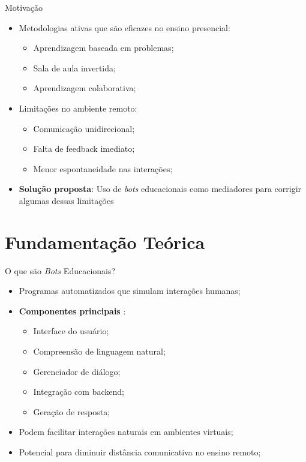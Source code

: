 \documentclass[aspectratio=169]{beamer}
\begin{document}
{\begin{frame}{Motivação}
  \begin{itemize}
  \item Metodologias ativas que são eficazes no ensino presencial:
    \begin{itemize}
    \item Aprendizagem baseada em problemas;
    \item Sala de aula invertida;
    \item Aprendizagem colaborativa;
    \end{itemize}
  \item Limitações no ambiente remoto:
    \begin{itemize}
    \item Comunicação unidirecional;
    \item Falta de feedback imediato;
    \item Menor espontaneidade nas interações;
    \end{itemize}
  \item \textbf{Solução proposta}: Uso de \textit{bots} educacionais como
  mediadores para corrigir algumas dessas limitações
  \end{itemize}
\end{frame}

\section{Fundamentação Teórica}

\begin{frame}{O que são \textit{Bots} Educacionais?}
  \begin{itemize}
  \item Programas automatizados que simulam interações humanas;
  \item \textbf{Componentes principais} \citep{huang2021}:
    \begin{itemize}
    \item Interface do usuário;
    \item Compreensão de linguagem natural;
    \item Gerenciador de diálogo;
    \item Integração com backend;
    \item Geração de resposta;
    \end{itemize}
  \item Podem facilitar interações naturais em ambientes virtuais;
  \item Potencial para diminuir distância comunicativa no ensino remoto;
  \end{itemize}
\end{frame}

}
\end{document}
